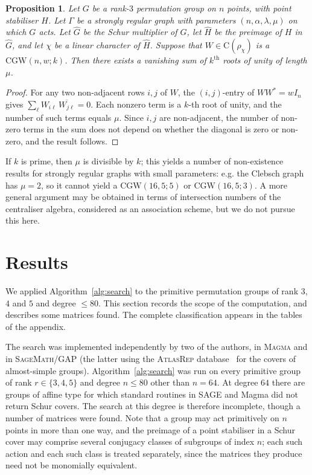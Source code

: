 \documentclass{article}
\newtheorem{proposition}[theorem]{Proposition}
\theoremstyle{definition}
\theoremstyle{remark}
\newcommand{\Cr}{\mathrm{C}}
\newcommand{\CGW}{\mathrm{CGW}}
\begin{document}
\begin{proposition}\label{prop:lam-leung-cgw}
Let $G$ be a rank-$3$ permutation group on $n$ points, with point stabiliser $H$. Let $\Gamma$ be a strongly regular graph with parameters $(n, \alpha, \lambda, \mu)$ on which $G$ acts. Let $\hat{G}$ be the Schur multiplier of $G$, let $\hat{H}$ be the preimage of $H$ in $\hat{G}$, and let $\chi$ be a linear character of $\hat{H}$. Suppose that $W \in \Cr(\rho_\chi)$ is a $\CGW(n,w;k)$. Then there exists a vanishing sum of $k^{\textrm{th}}$ roots of unity of length $\mu$. 
\end{proposition}

\begin{proof}
For any two non-adjacent rows $i,j$ of $W$, the $(i,j)$-entry of $WW^* = wI_n$ gives $\sum_\ell W_{i\ell}\,\overline{W_{j\ell}} = 0$.
Each nonzero term is a $k$-th root of unity, and the number of such terms equals $\mu$. Since $i, j$ are non-adjacent, the number of non-zero terms in the sum does not depend on whether the diagonal is zero or non-zero, and the result follows. 
\end{proof}

If $k$ is prime, then $\mu$ is divisible by $k$; this yields a number of non-existence results for strongly regular graphs with small parameters: e.g. the Clebsch graph has $\mu = 2$, so it cannot yield a $\CGW(16,5;5)$ or $\CGW(16,5;3)$. A more general argument may be obtained in terms of intersection numbers of the centraliser algebra, considered as an association scheme, but we do not pursue this here.

\section{Results}\label{sec:families}

We applied Algorithm~\ref{alg:search} to the primitive permutation
groups of rank $3$, $4$ and $5$ and degree $\leq 80$. This section records the scope of the computation, and describes some matrices found. The complete classification appears in the tables of the appendix.

The search was implemented independently by two of the authors, in
\textsc{Magma} and in \textsc{SageMath}/\textsc{GAP} (the latter using the
\textsc{AtlasRep} database~\cite{AtlasRep} for the covers of almost-simple
groups). Algorithm~\ref{alg:search} was run on every primitive group of
rank $r \in \{3,4,5\}$ and degree $n \leq 80$ other than $n=64$. At degree $64$ there are groups of affine type for which standard routines in {\sc SAGE} and {\sc Magma} did not return Schur covers. The search at this degree is therefore
incomplete, though a number of matrices were found. Note that a group may act
primitively on $n$ points in more than one way, and the preimage of a
point stabiliser in a Schur cover may comprise several conjugacy classes
of subgroups of index $n$; each such action and each such class is
treated separately, since the matrices they produce need not be
monomially equivalent. 
\end{document}
